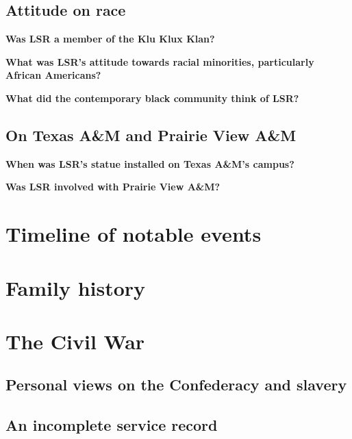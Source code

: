 \documentclass[12pt]{article}
\begin{document}
\subsection{Attitude on race}
\textbf{Was LSR a member of the Klu Klux Klan? \\ }

\textbf{What was LSR's attitude towards racial minorities, particularly African Americans? \\ }

\textbf{What did the contemporary black community think of LSR? \\ }

\subsection{On Texas A\&M and Prairie View A\&M}
\textbf{When was LSR's statue installed on Texas A\&M's campus? \\ }

\textbf{Was LSR involved with Prairie View A\&M? \\ }

\newpage
\section{Timeline of notable events}

\newpage
\section{Family history}

\newpage
\section{The Civil War}

\subsection{Personal views on the Confederacy and slavery}

\subsection{An incomplete service record}
\end{document}
